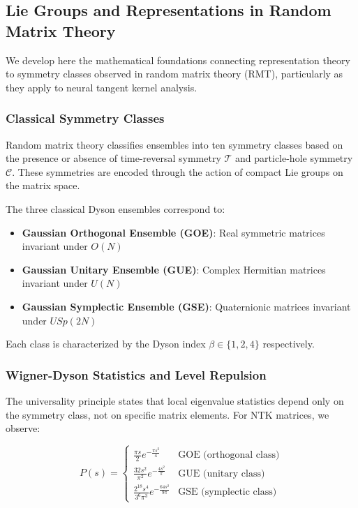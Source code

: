 \documentclass[a4paper]{article}
\theoremstyle{plain}
\theoremstyle{definition}
\theoremstyle{remark}
\begin{document}
\subsection{Lie Groups and Representations in Random Matrix Theory}

We develop here the mathematical foundations connecting representation theory to symmetry classes observed in random matrix theory (RMT), particularly as they apply to neural tangent kernel analysis.

\subsubsection{Classical Symmetry Classes}

Random matrix theory classifies ensembles into ten symmetry classes based on the presence or absence of time-reversal symmetry $\mathcal{T}$ and particle-hole symmetry $\mathcal{C}$. These symmetries are encoded through the action of compact Lie groups on the matrix space.

\begin{tcolorbox}[colback=blue!10,colframe=blue!60!black,title={\textbf{📖 DEFINITION: Dyson's Threefold Way}},enhanced,drop shadow]
The three classical Dyson ensembles correspond to:
\begin{itemize}
    \item \textbf{Gaussian Orthogonal Ensemble (GOE)}: Real symmetric matrices invariant under $O(N)$
    \item \textbf{Gaussian Unitary Ensemble (GUE)}: Complex Hermitian matrices invariant under $U(N)$  
    \item \textbf{Gaussian Symplectic Ensemble (GSE)}: Quaternionic matrices invariant under $USp(2N)$
\end{itemize}
Each class is characterized by the Dyson index $\beta \in \{1, 2, 4\}$ respectively.
\end{tcolorbox}

\subsubsection{Wigner-Dyson Statistics and Level Repulsion}

The universality principle states that local eigenvalue statistics depend only on the symmetry class, not on specific matrix elements. For NTK matrices, we observe:

\begin{equation}
P(s) = \begin{cases}
\frac{\pi s}{2} e^{-\frac{\pi s^2}{4}} & \text{GOE (orthogonal class)} \\
\frac{32s^2}{\pi^2} e^{-\frac{4s^2}{\pi}} & \text{GUE (unitary class)} \\
\frac{2^{18} s^4}{3^6 \pi^3} e^{-\frac{64s^2}{9\pi}} & \text{GSE (symplectic class)}
\end{cases}
\end{equation}
\end{document}
